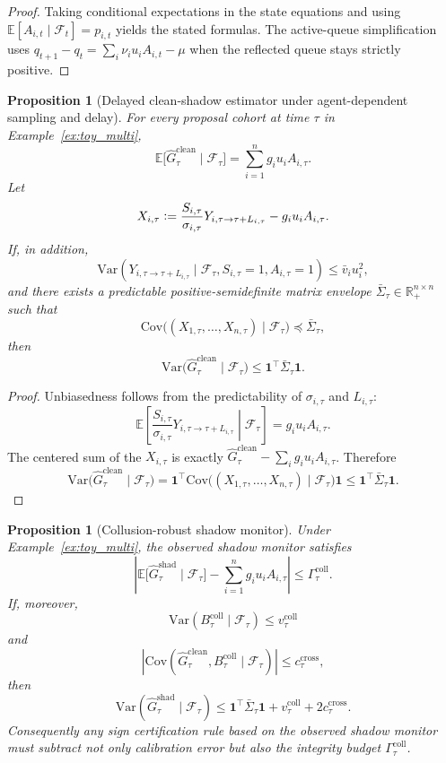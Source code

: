 \documentclass[11pt]{article}
\newtheorem{proposition}[theorem]{Proposition}
\theoremstyle{definition}
\newcommand{\R}{\mathbb{R}}
\newcommand{\E}{\mathbb{E}}
\newcommand{\Var}{\mathrm{Var}}
\newcommand{\Cov}{\mathrm{Cov}}
\newcommand{\1}{\mathbf{1}}
\newcommand{\abs}[1]{\left\lvert #1 \right\rvert}
\newcommand{\Defeq}{\vcentcolon=}
\begin{document}
\begin{proof}
Taking conditional expectations in the state equations and using $\E[A_{i,t}\mid\mathcal F_t]=p_{i,t}$ yields the stated formulas. The active-queue simplification uses $q_{t+1}-q_t=\sum_i\nu_i u_iA_{i,t}-\mu$ when the reflected queue stays strictly positive.
\end{proof}


\begin{proposition}[Delayed clean-shadow estimator under agent-dependent sampling and delay]\label{prop:shadow_unbiased}
For every proposal cohort at time $\tau$ in Example~\ref{ex:toy_multi},
\[
\E\bigl[\widehat G_\tau^{\mathrm{clean}}\mid \mathcal F_\tau\bigr] = \sum_{i=1}^n g_i u_i A_{i,\tau}.
\]
Let
\[
X_{i,\tau}\Defeq \frac{S_{i,\tau}}{\sigma_{i,\tau}}Y_{i,\tau\to \tau+L_{i,\tau}}-g_i u_i A_{i,\tau}.
\]
If, in addition,
\[
\Var(Y_{i,\tau\to \tau+L_{i,\tau}}\mid \mathcal F_\tau,S_{i,\tau}=1,A_{i,\tau}=1)\le \bar v_i u_i^2,
\]
and there exists a predictable positive-semidefinite matrix envelope $\bar\Sigma_\tau\in\R_+^{n\times n}$ such that
\[
\Cov\bigl((X_{1,\tau},\dots,X_{n,\tau})\mid \mathcal F_\tau\bigr)\preceq \bar\Sigma_\tau,
\]
then
\[
\Var\bigl(\widehat G_\tau^{\mathrm{clean}}\mid \mathcal F_\tau\bigr)
\le
\mathbf 1^{\top}\bar\Sigma_\tau\mathbf 1.
\]
\end{proposition}

\begin{proof}
Unbiasedness follows from the predictability of $\sigma_{i,\tau}$ and $L_{i,\tau}$:
\[
\E\left[\frac{S_{i,\tau}}{\sigma_{i,\tau}}Y_{i,\tau\to \tau+L_{i,\tau}}\middle|\mathcal F_\tau\right]=g_i u_i A_{i,\tau}.
\]
The centered sum of the $X_{i,\tau}$ is exactly $\widehat G_\tau^{\mathrm{clean}}-\sum_i g_i u_i A_{i,\tau}$. Therefore
\[
\Var\bigl(\widehat G_\tau^{\mathrm{clean}}\mid \mathcal F_\tau\bigr)
=
\mathbf 1^{\top}\Cov\bigl((X_{1,\tau},\dots,X_{n,\tau})\mid \mathcal F_\tau\bigr)\mathbf 1
\le
\mathbf 1^{\top}\bar\Sigma_\tau\mathbf 1.
\]
\end{proof}

\begin{proposition}[Collusion-robust shadow monitor]\label{prop:collusion_shadow}
Under Example~\ref{ex:toy_multi}, the observed shadow monitor satisfies
\[
\abs{\E\bigl[\widehat G_\tau^{\mathrm{shad}}\mid \mathcal F_\tau\bigr]-\sum_{i=1}^n g_i u_i A_{i,\tau}}
\le
\Gamma_\tau^{\mathrm{coll}}.
\]
If, moreover,
\[
\Var(B_\tau^{\mathrm{coll}}\mid \mathcal F_\tau)\le v_\tau^{\mathrm{coll}}
\]
and
\[
\abs{\Cov(\widehat G_\tau^{\mathrm{clean}},B_\tau^{\mathrm{coll}}\mid \mathcal F_\tau)}\le c_\tau^{\mathrm{cross}},
\]
then
\[
\Var(\widehat G_\tau^{\mathrm{shad}}\mid \mathcal F_\tau)
\le
\mathbf 1^{\top}\bar\Sigma_\tau\mathbf 1 + v_\tau^{\mathrm{coll}} + 2c_\tau^{\mathrm{cross}}.
\]
Consequently any sign certification rule based on the observed shadow monitor must subtract not only calibration error but also the integrity budget $\Gamma_\tau^{\mathrm{coll}}$.
\end{proposition}
\end{document}
